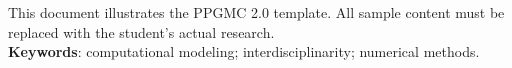 This document illustrates the PPGMC 2.0 template. All sample content must be replaced with the student's actual research.\\
\textbf{Keywords}: computational modeling; interdisciplinarity; numerical methods.
